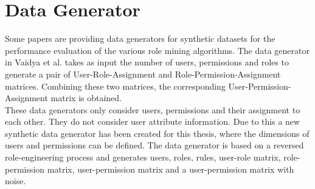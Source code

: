 \section{Data Generator}
\label{sec:A_dataGenerator}
	Some papers are providing data generators for synthetic datasets for the performance evaluation of the various role mining algorithms. The data generator in Vaidya et al.\cite{Vaidya:2006:RMR:1180405.1180424} takes as input the number of users, permissions and roles to generate a pair of User-Role-Assignment and Role-Permission-Assignment matrices. Combining these two matrices, the corresponding User-Permission-Assignment matrix is obtained.\\
	These data generators only consider users, permissions and their assignment to each other. They do not consider user attribute information. Due to this a new synthetic data generator has been created for this thesis, where the dimensions of users and permissions can be defined. The data generator is based on a reversed role-engineering process and generates users, roles, rules, user-role matrix, role-permission matrix, user-permission matrix and a user-permission matrix with noise.
